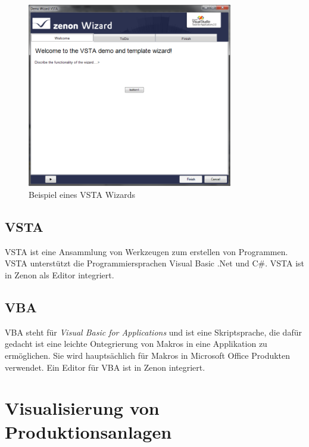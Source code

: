 \begin{figure}[h!]
		\centering
		\includegraphics[width=0.8\textwidth]{graphics/stateoftheart/demowizard.png}
		\caption{Beispiel eines \ac{VSTA} Wizards}
		\label{fig:zenwiz}
\end{figure}

\subsection{\ac{VSTA}}
\ac{VSTA} ist eine Ansammlung von Werkzeugen zum erstellen von Programmen. \ac{VSTA} unterstützt die Programmiersprachen Visual Basic .Net und C\#.
\ac{VSTA} ist in Zenon als Editor integriert.



\subsection{\ac{VBA}}
\ac{VBA} steht für \textit{Visual Basic for Applications} und ist eine Skriptsprache, die dafür gedacht ist eine leichte Ontegrierung von Makros in eine Applikation zu ermöglichen. Sie wird hauptsächlich für Makros in Microsoft Office Produkten verwendet.
Ein Editor für \ac{VBA} ist in Zenon integriert.



\section{Visualisierung von Produktionsanlagen}
